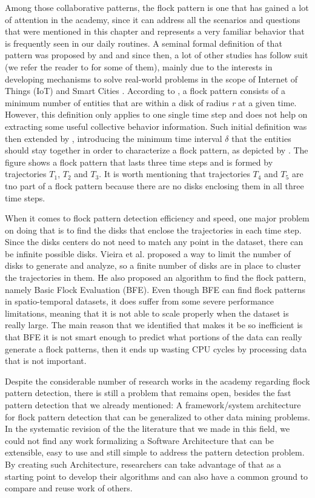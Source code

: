 Among those collaborative patterns, the flock pattern is one that has gained a lot of attention in the academy, since it
can address all the scenarios and questions that were mentioned in this chapter and represents a very familiar behavior
that is frequently seen in our daily routines. A seminal formal definition of that pattern was proposed by \citep{remo}
and \citep{gudefficient} and since then, a lot of other studies has follow suit (we refer the reader to
 for some of them), mainly due to the interests in developing mechanisms to solve real-world
problems in the scope of Internet of Things (IoT) \citep{iot} and Smart Cities \citep{smartcities}.  According to
\citep{gudefficient}, a flock pattern consists of a minimum number of entities that are within a disk of radius
\textit{r} at a given time. However, this definition only applies to one single time step and does not help on
extracting some useful collective behavior information. Such initial definition was then extended by
\citep{gudreportingflock}, introducing the minimum time interval $\delta$ that the entities should stay together in
order to characterize a flock pattern, as depicted by . The figure shows a flock pattern that lasts
three time steps and is formed by trajectories $T_1$, $T_2$ and $T_3$. It is worth mentioning that trajectories $T_4$
and $T_5$ are tno part of a flock pattern because there are no disks enclosing them in all three time steps.

When it comes to flock pattern detection efficiency and speed, one major problem on doing that is to find the disks that
enclose the trajectories in each time step. Since the disks centers do not need to match any point in the dataset, there
can be infinite possible disks. Vieira et al. \citep{vieira} proposed a way to limit the number of disks to generate and
analyze, so a finite number of disks are in place to cluster the trajectories in them. He also proposed an algorithm to
find the flock pattern, namely Basic Flock Evaluation (BFE). Even though BFE can find flock patterns in spatio-temporal
datasets, it does suffer from some severe performance limitations, meaning that it is not able to scale properly when
the dataset is really large. The main reason that we identified that makes it be so inefficient is that BFE it is not
smart enough to predict what portions of the data can really generate a flock patterns, then it ends up wasting
CPU cycles by processing data that is not important.

Despite the considerable number of research works in the academy regarding flock pattern detection, there is still a
problem that remains open, besides the fast pattern detection that we already mentioned: A framework/system architecture
for flock pattern detection that can be generalized to other data mining problems. In the systematic revision of the
the literature that we made in this field, we could not find any work formalizing a Software Architecture that can be
extensible, easy to use and still simple to address the pattern detection problem. By creating such Architecture,
researchers can take advantage of that as a starting point to develop their algorithms and can also have a common ground
to compare and reuse work of others.

